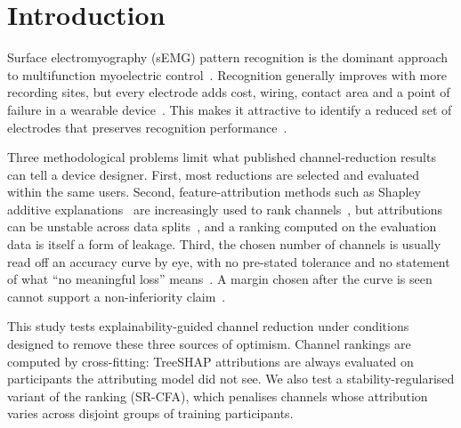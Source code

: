 \section{Introduction}
\label{sec:introduction}

Surface electromyography (sEMG) pattern recognition is the dominant approach to multifunction myoelectric control~\cite{hudgins1993new,englehart2003robust,scheme2011electromyogram,farina2014extraction}. Recognition generally improves with more recording sites, but every electrode adds cost, wiring, contact area and a point of failure in a wearable device~\cite{vujaklija2016new}. This makes it attractive to identify a reduced set of electrodes that preserves recognition performance~\cite{phinyomark2012feature,liu2014emg,altimemy2013classification,stango2015spatial,qu2021reduce}.

Three methodological problems limit what published channel-reduction results can tell a device designer. First, most reductions are selected and evaluated within the same users.  Second, feature-attribution methods such as Shapley additive explanations~\cite{lundberg2017unified,lundberg2020local} are increasingly used to rank channels~\cite{salmi2025shapaad}, but attributions can be unstable across data splits~\cite{visani2022statistical,kelodjou2023shaping,xiang2026roshap}, and a ranking computed on the evaluation data is itself a form of leakage. Third, the chosen number of channels is usually read off an accuracy curve by eye, with no pre-stated tolerance and no statement of what ``no meaningful loss'' means~\cite{schuirmann1987comparison,walker2011understanding}. A margin chosen after the curve is seen cannot support a non-inferiority claim~\cite{campbell2018noninferiority}.

This study tests explainability-guided channel reduction under conditions designed to remove these three sources of optimism.  Channel rankings are computed by cross-fitting: TreeSHAP attributions are always evaluated on participants the attributing model did not see.  We also test a stability-regularised variant of the ranking (SR-CFA), which penalises channels whose attribution varies across disjoint groups of training participants.

